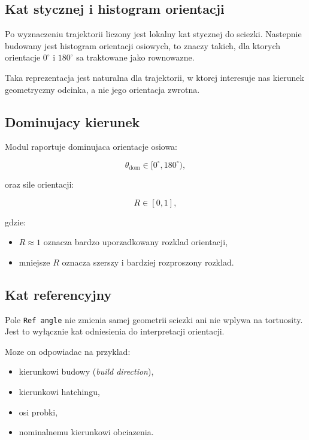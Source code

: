 \documentclass[11pt,a4paper]{article}
\begin{document}
\subsection{Kat stycznej i histogram orientacji}

Po wyznaczeniu trajektorii liczony jest lokalny kat stycznej do sciezki.
Nastepnie budowany jest histogram orientacji osiowych, to znaczy takich, dla
ktorych orientacje \(0^\circ\) i \(180^\circ\) sa traktowane jako rownowazne.

Taka reprezentacja jest naturalna dla trajektorii, w ktorej interesuje nas
kierunek geometryczny odcinka, a nie jego orientacja zwrotna.

\subsection{Dominujacy kierunek}

Modul raportuje dominujaca orientacje osiowa:

\begin{equation}
    \theta_{\mathrm{dom}} \in [0^\circ, 180^\circ),
\end{equation}

oraz sile orientacji:

\begin{equation}
    R \in [0, 1],
\end{equation}

gdzie:

\begin{itemize}[leftmargin=1.5em]
    \item \(R \approx 1\) oznacza bardzo uporzadkowany rozklad orientacji,
    \item mniejsze \(R\) oznacza szerszy i bardziej rozproszony rozklad.
\end{itemize}

\subsection{Kat referencyjny}

Pole \texttt{Ref angle} nie zmienia samej geometrii sciezki ani nie wplywa na
tortuosity. Jest to wyłącznie kat odniesienia do interpretacji orientacji.

Moze on odpowiadac na przyklad:

\begin{itemize}[leftmargin=1.5em]
    \item kierunkowi budowy (\emph{build direction}),
    \item kierunkowi hatchingu,
    \item osi probki,
    \item nominalnemu kierunkowi obciazenia.
\end{itemize}
\end{document}

